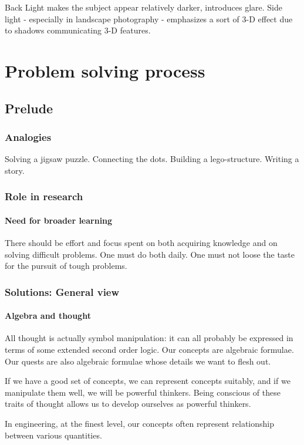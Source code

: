 \documentclass[oneside, article]{memoir}
\begin{document}
Back Light makes the subject appear relatively darker, introduces glare. Side light - especially in landscape photography - emphasizes a sort of 3-D effect due to shadows communicating 3-D features.


\part{Problem solving process}
\chapter{Prelude}
\section{Analogies}
Solving a jigsaw puzzle. Connecting the dots. Building a lego-structure. Writing a story.

\section{Role in research}
\subsection{Need for broader learning}
There should be effort and focus spent on both acquiring knowledge and on solving difficult problems. One must do both daily. One must not loose the taste for the pursuit of tough problems.

\section{Solutions: General view}
\subsection{Algebra and thought}
All thought is actually symbol manipulation: it can all probably be expressed in terms of some extended second order logic. Our concepts are algebraic formulae. Our quests are also algebraic formulae whose details we want to flesh out.

If we have a good set of concepts, we can represent concepts suitably, and if we manipulate them well, we will be powerful thinkers. Being conscious of these traits of thought allows us to develop ourselves as powerful thinkers.

In engineering, at the finest level, our concepts often represent relationship between various quantities.
\end{document}
